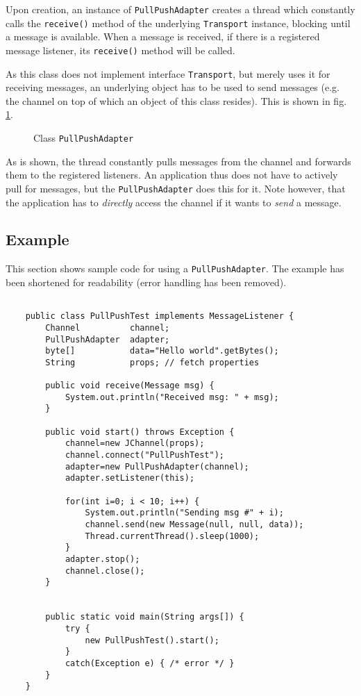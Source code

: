   Upon creation, an instance of {\tt PullPushAdapter} creates a thread which
  constantly calls the {\tt receive()} method of the underlying {\tt Transport}
  instance, blocking until a message is available. When a message is received, if
  there is a registered message listener, its {\tt receive()} method will be called.

  As this class does not implement interface {\tt Transport}, but merely uses it
  for receiving messages, an underlying object has to be used to send messages
  (e.g. the channel on top of which an object of this class resides). This is shown
  in fig. \ref{PullPushAdapterFig}.


  \begin{figure}[htb]
    \caption{Class {\tt PullPushAdapter}}
    \label{PullPushAdapterFig}
  \end{figure}

  As is shown, the thread constantly pulls messages from the channel and forwards
  them to the registered listeners. An application thus does not have to actively pull
  for messages, but the {\tt PullPushAdapter} does this for it. Note however, that
  the application has to {\em directly} access the channel if it wants to {\em send}
  a message.



    \subsection{Example}

    This section shows sample code for using a {\tt PullPushAdapter}. The example has
    been shortened for readability (error handling has been removed).

    \begin{small}
    \begin{verbatim}

    public class PullPushTest implements MessageListener {
        Channel          channel;
        PullPushAdapter  adapter;
        byte[]           data="Hello world".getBytes();
        String           props; // fetch properties

        public void receive(Message msg) {
            System.out.println("Received msg: " + msg);
        }

        public void start() throws Exception {
            channel=new JChannel(props);
            channel.connect("PullPushTest");
            adapter=new PullPushAdapter(channel);
            adapter.setListener(this);
        
            for(int i=0; i < 10; i++) {
                System.out.println("Sending msg #" + i);
                channel.send(new Message(null, null, data));
                Thread.currentThread().sleep(1000);
            }
            adapter.stop();
            channel.close();
        }


        public static void main(String args[]) {
            try {
                new PullPushTest().start();
            }
            catch(Exception e) { /* error */ }
        }
    }
    \end{verbatim}
    \end{small}

